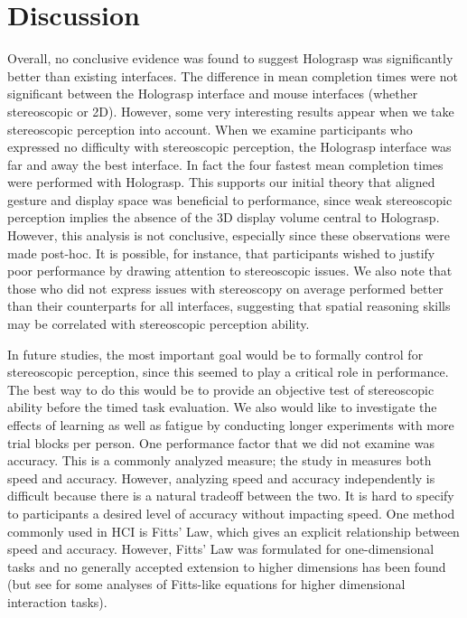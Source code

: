 \documentclass[pageno]{jpaper}
\begin{document}
\newpage
\section{Discussion}
Overall, no conclusive evidence was found to suggest Holograsp was significantly better than existing interfaces. The difference in mean
completion times were not significant between the Holograsp interface and mouse interfaces (whether stereoscopic or 2D). However, some very
interesting results appear when we take stereoscopic perception into account. When we examine participants who expressed no difficulty with
stereoscopic perception, the Holograsp interface was far and away the best interface. In fact the four fastest mean completion times were
performed with Holograsp. This supports our initial theory that aligned gesture and display space was beneficial to performance, since weak
stereoscopic perception implies the absence of the 3D display volume central to Holograsp. However, this analysis is not conclusive, especially since these observations
were made post-hoc. It is possible, for instance, that participants wished to justify poor performance by drawing attention to stereoscopic issues.
We also note that those who did not express issues with stereoscopy on average performed better than their counterparts for all interfaces, suggesting
that spatial reasoning skills may be correlated with stereoscopic perception ability.

In future studies, the most important goal would be to formally
control for stereoscopic perception, since this seemed to play a critical role in performance. The best way to do this
would be to provide an objective test of stereoscopic ability before the timed task evaluation. We also
would like to investigate the effects of learning as well as fatigue by conducting longer experiments with
more trial blocks per person. One performance factor that we did not examine was accuracy. This is a commonly analyzed measure; the study in \cite{study1}
measures both speed and accuracy. However, analyzing speed and accuracy independently is difficult because
there is a natural tradeoff between the two. It is hard to specify to participants a desired level of accuracy without impacting speed.
One method commonly used in HCI is Fitts' Law, which gives an explicit relationship between
speed and accuracy. However, Fitts' Law was formulated for one-dimensional tasks and no generally accepted extension
to higher dimensions has been found (but see \cite{mackenzie1992extending, monk1985fitts, murata2001extending} for some analyses of Fitts-like equations for higher
dimensional interaction tasks). 
\end{document}
